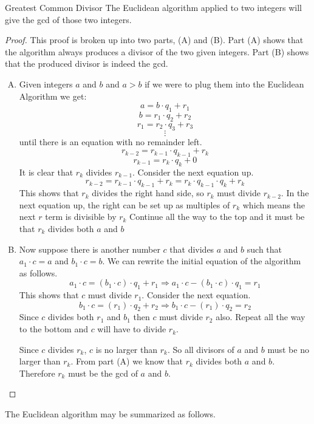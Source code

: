 \begin{prop}{Greatest Common Divisor}
The Euclidean algorithm applied to two integers will give the gcd of those two integers.
\end{prop}
\begin{proof}
This proof is broken up into two parts, (A) and (B).  Part (A) shows that the algorithm always produces a divisor of the two given integers.  Part (B) shows that the produced divisor is indeed the gcd.

\begin{enumerate}[(A)]
\item
Given integers $a$ and $b$ and $a>b$ if we were to plug them into the Euclidean Algorithm we get:
\[a = b\cdot q_1 + r_1\]
\[b = r_1\cdot q_2 + r_2\]
\[r_1 = r_2\cdot q_3 + r_3\]
\[\vdots\]
until there is an equation with no remainder left.
\[r_{k-2} = r_{k-1}\cdot q_{k-1} + r_k\]
\[r_{k-1} = r_k\cdot q_k + 0\]
It is clear that $r_k$ divides $r_{k-1}$. Consider the next equation up.  
\[r_{k-2} = r_{k-1}\cdot q_{k-1} + r_k = r_{k}\cdot q_{k-1} \cdot q_{k} + r_k\]
This shows that $r_{k} $ divides the right hand side, so $r_{k}$ must divide $r_{k-2}$.
In the next equation up, the right can be set up as multiples of $r_{k}$ which means the next $r$ term is divisible by $r_k$
Continue all the way to the top and it must be that $r_k$ divides both $a$ and $b$
\item
Now suppose there is another number $c$ that divides $a$ and $b$ such that $a_1 \cdot c = a$ and $b_1 \cdot c = b$.  We can rewrite the initial equation of the algorithm as follows.
\[a_1\cdot c = (b_1 \cdot c)\cdot q_1 + r_1 \Rightarrow a_1\cdot c - (b_1 \cdot c)\cdot q_1 = r_1\]
This shows that $c$ must divide $r_1$.  Consider the next equation.
\[b_1\cdot c = (r_1)\cdot q_2 + r_2 \Rightarrow b_1\cdot c - (r_1)\cdot q_2 = r_2\]
Since $c$ divides both $r_1$ and $b_1$ then $c$ must divide $r_2$ also.
Repeat all the way to the bottom and $c$ will have to divide $r_k$.

Since $c$ divides $r_k$, $c$ is no larger than $r_k$.  So all divisors of $a$ and $b$ must be no larger than $r_k$.  From part (A) we know that $r_k$ divides both $a$ and $b$. Therefore $r_k$ must be the gcd of $a$ and $b$.
\end {enumerate}
\end {proof}

The Euclidean algorithm may be summarized as follows.

